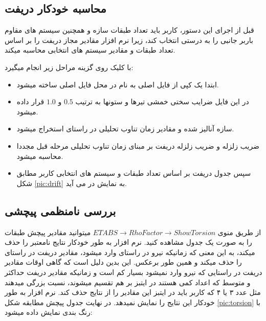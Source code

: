 \subsection{محاسبه خودکار دریفت}
قبل از اجرای این دستور، کاربر باید تعداد طبقات سازه و همچنین سیستم های مقاوم باربر جانبی را به درستی انتخاب کند، زیرا نرم افزار مقادیر مجاز دریفت را بر اساس تعداد طبقات و مقادیر 
سیستم های انتخابی محاسبه میکند.

با کلیک روی گزینه 
مراحل زیر انجام میگیرد:
\begin{itemize}
    \item ابتدا یک کپی از فایل اصلی به نام  در محل فایل اصلی ساخته میشود.
    \item در این فایل ضرایب سختی خمشی تیرها و ستونها به ترتیب $0.5$ و $1.0$ قرار داده میشود.
    \item سازه آنالیز شده و مقادیر زمان تناوب تحلیلی در راستای  استخراج میشود.
    \item ضریب زلزله و ضریب زلزله دریفت بر مبنای زمان تناوب تحلیلی مرحله قبل مجددا محاسبه میشود.
    \item سپس جدول دریفت بر اساس تعداد طبقات و سیستم های انتخابی کاربر مطابق شکل \ref{pic:drift} به نمایش در می آید.
\end{itemize}

\subsection{بررسی نامنظمی پیچشی}
از طریق منوی 
$ETABS \rightarrow Rho Factor \rightarrow Show Torsion$
میتوانید مقادیر پیچش طبقات را به صورت یک جدول مشاهده کنید. نرم افزار به طور خودکار نتایج نامعتبر را حذف میکند، به این معنی که زمانیکه نیرو در راستای 
وارد میشود، مقادیر دریفت در راستای  را حذف میکند و همین طور برعکس. این بدین دلیل است که گاهی اوقات مقادیر دریفت در راستایی که نیرو وارد نمیشود
بسیار کم است و زمانیکه مقادیر دریفت حداکثر و متوسط که اعداد کمی هستند در ایتبز بر هم تقسیم میشوند،‌ نسبت بزرگی میدهند مثل عدد ۳ یا ۴ که کاربر باید در ایتبز این
مقادیر را از نتایج حذف کند. نرم افزار به طور خودکار این نتایج را نمایش نمیدهد. در نهایت جدول پیچش مطابقه شکل 
\ref{pic:torsion}
با رنگ بندی نمایش داده میشود:

